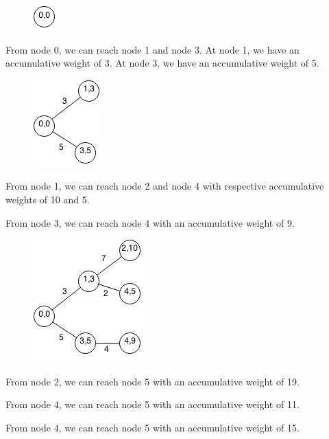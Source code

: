 \documentclass[11pt,oneside]{book}
\makeatletter
\def\maxwidth#1{\ifdim\Gin@nat@width>#1 #1\else\Gin@nat@width\fi}
\makeatother
\begin{document}
\vspace{5px}\begin{figure}[H]\centering
        \includegraphics[width=0.66\maxwidth{\textwidth}]{bellmanford2.png}
        \end{figure}

From node 0, we can reach node 1 and node 3. At node 1, we have an accumulative weight of 3. At node 3, we have an accumulative weight of 5.

\vspace{5px}\begin{figure}[H]\centering
        \includegraphics[width=0.66\maxwidth{\textwidth}]{bellmanford3.png}
        \end{figure}

From node 1, we can reach node 2 and node 4 with respective accumulative weights of 10 and 5.

From node 3, we can reach node 4 with an accumulative weight of 9.

\vspace{5px}\begin{figure}[H]\centering
        \includegraphics[width=0.66\maxwidth{\textwidth}]{bellmanford4.png}
        \end{figure}

From node 2, we can reach node 5 with an accumulative weight of 19.

From node 4, we can reach node 5 with an accumulative weight of 11.

From node 4, we can reach node 5 with an accumulative weight of 15.
\end{document}
